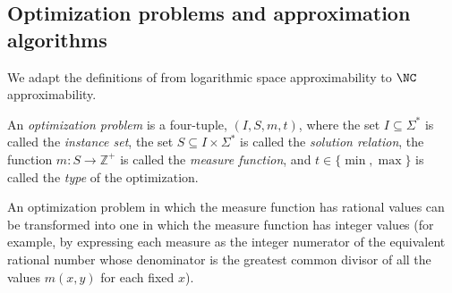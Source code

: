 \subsection{Optimization problems and approximation algorithms}

We adapt the definitions of \cite{tantau07} from logarithmic space approximability to $\NC$ approximability.

\begin{definition}
  An \emph{optimization problem} is a four-tuple, $(I, S, m, t)$, where the set $I \subseteq \Sigma^*$ is called the \emph{instance set}, the set $S \subseteq I \times \Sigma^*$ is called the \emph{solution relation}, the function $m \colon S \to \mathbb{Z}^+$ is called the \emph{measure function}, and $t \in \{\min, \max\}$ is called the \emph{type} of the optimization.
\end{definition}

An optimization problem in which the measure function has rational values can be transformed into one in which the measure function has integer values \cite[page~23]{acgkmp99} (for example, by expressing each measure as the integer numerator of the equivalent rational number whose denominator is the greatest common divisor of all the values $m(x, y)$ for each fixed $x$).

